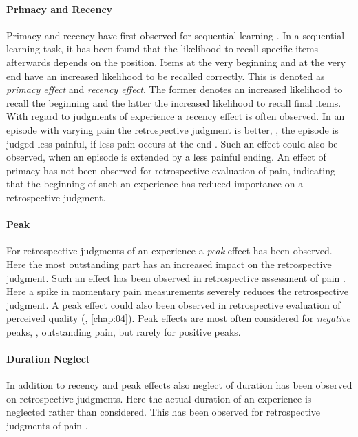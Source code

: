 \paragraph*{Primacy and Recency}
Primacy and recency have first observed for sequential learning \citep[\cf,][]{murdock_jr._serial_1962}.
In a sequential learning task, it has been found that the likelihood to recall specific items afterwards depends on the position.
Items at the very beginning and at the very end have an increased likelihood to be recalled correctly.
This is denoted as \emph{primacy effect} and \emph{recency effect}.
The former denotes an increased likelihood to recall the beginning and the latter the increased likelihood to recall final items.
With regard to judgments of experience a recency effect is often observed.
In an episode with varying pain the retrospective judgment is better, \ie, the episode is judged less painful, if less pain occurs at the end \citep[\cf,][]{kahneman_when_1993, redelmeier_patients_1996}.
Such an effect could also be observed, when an episode is extended by a less painful ending.
An effect of primacy has not been observed for retrospective evaluation of pain, indicating that the beginning of such an experience has reduced importance on a retrospective judgment.

\paragraph*{Peak}
For retrospective judgments of an experience a \emph{peak} effect has been observed.
Here the most outstanding part has an increased impact on the retrospective judgment.
Such an effect has been observed in retrospective assessment of pain \citep[\cf,][]{kahneman_when_1993, redelmeier_patients_1996}.
Here a spike in momentary pain measurements severely reduces the retrospective judgment.
A peak effect could also been observed in retrospective evaluation of perceived quality (\cf, \autoref{chap:04}).
Peak effects are most often considered for \emph{negative} peaks, \eg, outstanding pain, but rarely for positive peaks.

\paragraph*{Duration Neglect}
In addition to recency and peak effects also neglect of duration has been observed on retrospective judgments.
Here the actual duration of an experience is neglected rather than considered.
This has been observed for retrospective judgments of pain \citep[\cf,][]{fredrickson_duration_1993, ariely_combining_1998}.